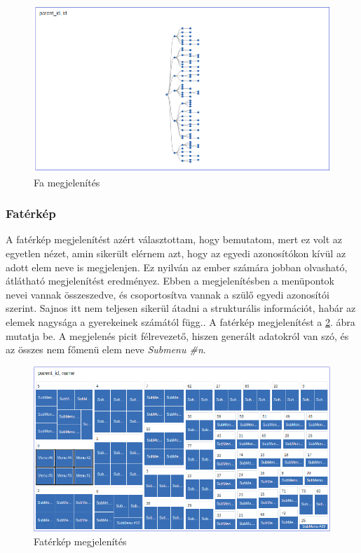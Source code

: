 		\begin{figure}[h!]
			\centering
			\includegraphics[width=1.0\linewidth]{keve_imgs/famegjelenites}
			\caption{Fa megjelenítés}
			\label{fig:famegjelenites}
		\end{figure}
	
		\subsubsection{Fatérkép}
		A fatérkép megjelenítést azért választottam, hogy bemutatom, mert ez volt az egyetlen nézet, amin sikerült elérnem azt, hogy az egyedi azonosítókon kívül az adott elem neve is megjelenjen. Ez nyilván az ember számára jobban olvasható, átlátható megjelenítést eredményez. Ebben a megjelenítésben a menüpontok nevei vannak összeszedve, és csoportosítva vannak a szülő egyedi azonosítói szerint. Sajnos itt nem teljesen sikerül átadni a strukturális információt, habár az elemek nagysága a gyerekeinek számától függ.. A fatérkép megjelenítést a \ref{fig:faterkepmegjelenites}. ábra mutatja be. A megjelenés picit félrevezető, hiszen generált adatokról van szó, és az összes nem főmenü elem neve \textit{Submenu \#n}.
		
		\pagebreak	

		\begin{figure}[h!]
			\centering
			\includegraphics[width=1.0\linewidth]{keve_imgs/faterkepmegjelenites}
			\caption{Fatérkép megjelenítés}
			\label{fig:faterkepmegjelenites}
		\end{figure}
	
